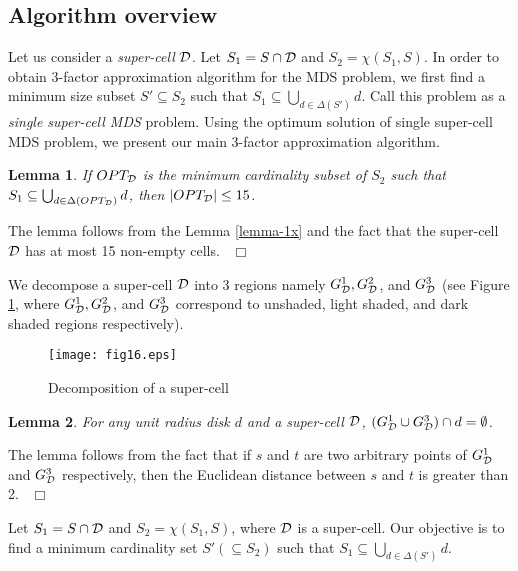 \documentclass[a4paper,11pt]{article}
\newtheorem{lemma}{Lemma}
\newenvironment{proof}{\noindent {\bf Proof:\,\ }}{\hfill\mbox{\
$\Box$}\smallskip}
\begin{document}
\subsection{Algorithm overview}
Let us consider a {\it super-cell} ${\cal D}$. Let $S_1 = S \cap {\cal D}$ and $S_2 = \chi(S_1, S)$. 
In order to obtain 3-factor approximation algorithm for the MDS problem, we first find a minimum 
size subset $S' \subseteq S_2$ such that $S_1 \subseteq \bigcup_{d \in \Delta(S')}d$. Call this problem 
as a {\it single super-cell MDS} problem. Using the optimum solution of single super-cell MDS problem, we 
present our main 3-factor approximation algorithm. 

\begin{lemma} \label{lemma-5x}
If $OPT_{\cal D}$ is the minimum cardinality subset of $S_2$ such that 
$S_1 \subseteq \bigcup_{d \in \Delta(OPT_{\cal D})} d$, then $|OPT_{\cal D}| \leq 15$.
\end{lemma}

\begin{proof}
The lemma follows from the Lemma \ref{lemma-1x} and the fact that the super-cell ${\cal D}$ 
has at most 15 non-empty cells.
\end{proof}

We decompose a super-cell ${\cal D}$ into 3 regions namely $G_{\cal D}^1, G_{\cal D}^2$, and $G_{\cal D}^3$ 
(see Figure \ref{fig:fig16},  where $G_{\cal D}^1, G_{\cal D}^2$, and $G_{\cal D}^3$ correspond to unshaded, 
light shaded, and dark shaded regions respectively). 

\begin{figure}[ht]
\begin{center}
\texttt{[image: fig16.eps]}
\caption{Decomposition of a super-cell}
\label{fig:fig16}
\end{center}
\end{figure}

\begin{lemma} \label{lemma-6x}
For any unit radius disk $d$ and a super-cell ${\cal D}$, $(G_{\cal D}^1 \cup G_{\cal D}^3) \cap d = \emptyset$. 
\end{lemma}

\begin{proof}
The lemma follows from the fact that if $s$ and $t$ are two arbitrary points of $G_{\cal D}^1$ and $G_{\cal D}^3$ 
respectively, then the Euclidean distance between $s$ and $t$ is greater than 2. 
\end{proof}

Let $S_1 = S \cap {\cal D}$ and $S_2 = \chi(S_1, S)$, where ${\cal D}$ is a super-cell. Our objective 
is to find a minimum cardinality set $S' (\subseteq S_2)$ such that $S_1 \subseteq \bigcup_{d \in \Delta(S')}d$.
\end{document}
